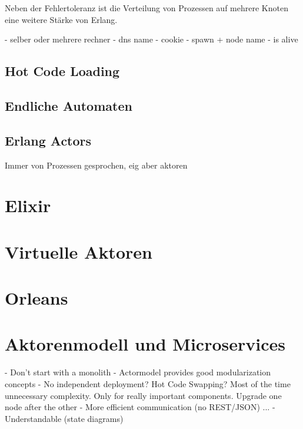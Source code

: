 Neben der Fehlertoleranz ist die Verteilung von Prozessen auf mehrere Knoten eine weitere Stärke von Erlang.

- selber oder mehrere rechner
- dns name
- cookie
- spawn + node name
- is alive

\subsection{Hot Code Loading}

\subsection{Endliche Automaten}

\subsection{Erlang Actors}

Immer von Prozessen gesprochen, eig aber aktoren

\section{Elixir}

\section{Virtuelle Aktoren}

\section{Orleans}

\section{Aktorenmodell und Microservices}

- Don't start with a monolith
- Actormodel provides good modularization concepts
- No independent deployment? Hot Code Swapping? Most of the time unnecessary complexity. Only for really important components. Upgrade one node after the other
- More efficient communication (no REST/JSON) ...
- Understandable (state diagrams)

\iffalse

Basic Structure:
- Actor Model Basics
- Erlang
- Elixir
- Virtual Actor Pattern
- Orleans

\fi
